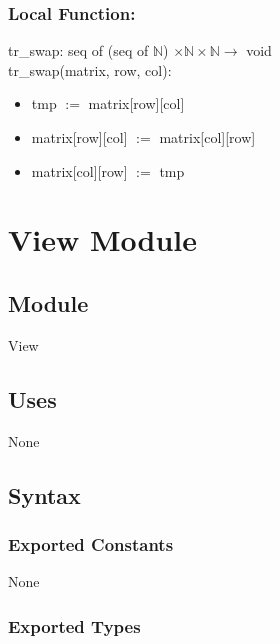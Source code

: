 \documentclass[12pt]{article}
\begin{document}
\subsubsection*{Local Function:}


\noindent tr\_swap: seq of (seq of $\mathbb{N}$) $\times \mathbb{N} \times \mathbb{N} \rightarrow$ void\\
\noindent tr\_swap(matrix, row, col): 
\begin{itemize}[\null]
  \item tmp $:=$ matrix[row][col]
  \item matrix[row][col] $:=$ matrix[col][row]
  \item matrix[col][row] $:=$ tmp
\end{itemize}

\newpage

\section* {View Module}

\subsection*{Module}

View

\subsection* {Uses}

None

\subsection* {Syntax}

\subsubsection* {Exported Constants}

None

\subsubsection* {Exported Types}
\end{document}
